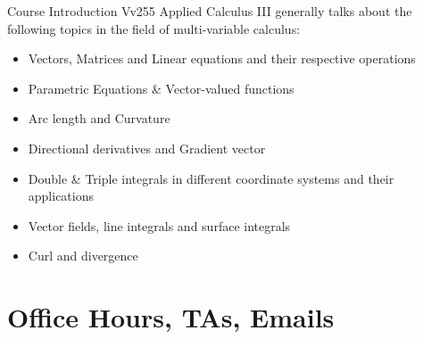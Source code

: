 \documentclass{beamer}
\begin{document}
\begin{frame}[allowframebreaks]{Course Introduction}
	Vv255 Applied Calculus III generally talks about the following topics in the field of multi-variable calculus:
\begin{itemize}
	\item Vectors, Matrices and Linear equations and their respective operations
	\item Parametric Equations \& Vector-valued functions
	\item Arc length and Curvature
	\item Directional derivatives and Gradient vector
	\item Double \& Triple integrals in different coordinate systems and their applications
	\item Vector fields, line integrals and surface integrals
	\item Curl and divergence
\end{itemize}

\end{frame}













\section{Office Hours, TAs, Emails}
\end{document}
